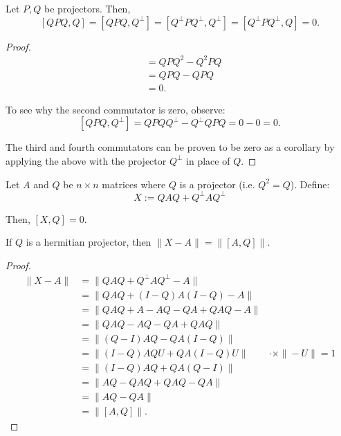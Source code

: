
\begin{lemma}
    Let $P, Q$ be projectors. Then,
    \[[QPQ, Q] = [QPQ, Q^\bot] = [Q^\bot P Q^\bot, Q^\bot] = [Q^\bot P Q^\bot, Q] = 0.\]
\end{lemma}
\begin{proof}
    \begin{align*}
        [QPQ, Q] &= QPQ^2 - Q^2PQ\\
        &= QPQ - QPQ\\
        &= 0.
    \end{align*}

\noindent To see why the second commutator is zero, observe:
\[
    [QPQ, Q^\bot] = QPQQ^\bot - Q^\bot QPQ = 0 - 0 = 0.
\]

\noindent The third and fourth commutators can be proven to be zero as a corollary by applying the above with the projector $Q^\bot$ in place of $Q$.
\end{proof}

\begin{fact}
    Let $A$ and $Q$ be $n \times n$ matrices where $Q$ is a projector (i.e. $Q^2 = Q$). Define:
    \begin{equation}
        X := QAQ + Q^\bot AQ^\bot
    \end{equation}
    
    \noindent Then, $[X, Q] = 0$.
    
    \noindent If $Q$ is a hermitian projector, then $\|X - A\| = \|[A,Q]\|$.
\end{fact}
\begin{proof}
    \begin{align*}
    \| X - A \| &= \| QAQ + Q^\bot A Q^\bot - A\|\\
    &= \| QAQ + (I-Q)A(I-Q) - A \|\\
    &= \| QAQ + A - AQ - QA + QAQ - A \|\\
    &= \| QAQ - AQ - QA + QAQ \|\\
    &= \|(Q - I)AQ - QA(I - Q) \|\\
    &= \|(I - Q)AQU + QA(I - Q) U \| & \cdot \times \|-U\| = 1\\
    &= \|(I - Q)AQ + QA(Q - I) \|\\
    &= \| AQ - QAQ + QAQ - QA\|\\
    &= \| AQ - QA\|\\
    &= \|[A, Q] \|.
\end{align*}
\end{proof}

